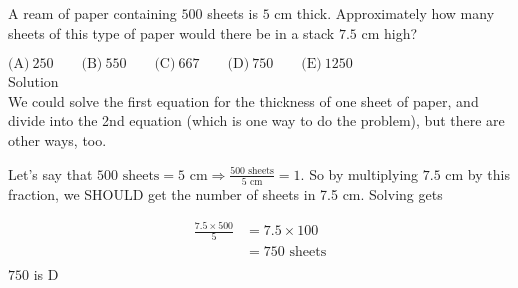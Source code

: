 

A ream of paper containing $500$ sheets is $5$ cm thick. Approximately how many sheets of this type of paper would there be in a stack $7.5$ cm high?

$\text{(A)}\ 250 \qquad \text{(B)}\ 550 \qquad \text{(C)}\ 667 \qquad \text{(D)}\ 750 \qquad \text{(E)}\ 1250$
\\
Solution
\\
We could solve the first equation for the thickness of one sheet of paper, and divide into the 2nd equation (which is one way to do the problem), but there are other ways, too.

Let's say that $500\text{ sheets}=5\text{ cm}\Rightarrow \frac{500 \text{ sheets}}{5 \text{ cm}} = 1$. So by multiplying $7.5 \text{ cm}$ by this fraction, we SHOULD get the number of sheets in 7.5 cm. Solving gets

\begin{align*} \frac{7.5 \times 500}{5} &= 7.5 \times 100 \\ &= 750 \text{ sheets} \\ \end{align*}
$750$ is $\boxed{\text{D}}$
